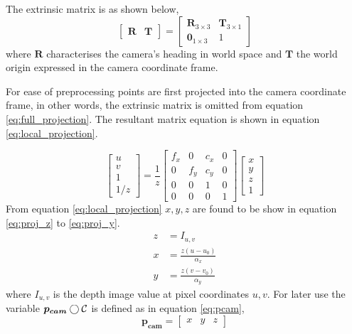 The extrinsic matrix is as shown below,
\begin{equation}\label{eq:extrinsic}
    \begin{bmatrix}
        \boldsymbol{R} & \boldsymbol{T}
    \end{bmatrix}
    =
    \begin{bmatrix}
        \boldsymbol{R}_{3\times3} & \boldsymbol{T}_{3\times1} \\
        \boldsymbol{0}_{1\times3} & 1
    \end{bmatrix}
\end{equation}
where \(\boldsymbol{R}\) characterises the camera's heading in world space and \(\boldsymbol{T}\) the world origin expressed in 
the camera coordinate frame.

For ease of preprocessing points are first projected into the camera coordinate frame, in other words, the extrinsic matrix is omitted from equation \ref{eq:full_projection}.
The resultant matrix equation is shown in equation \ref{eq:local_projection}.

\begin{equation} \label{eq:local_projection}
    \begin{bmatrix}
        u \\
        v \\
        1 \\
        1/z
    \end{bmatrix}
    = \frac{1}{z}
    \begin{bmatrix}
        f_x & 0 & c_x & 0 \\
        0 & f_y & c_y & 0 \\
        0 & 0 & 1 & 0 \\
        0 & 0 & 0 & 1
    \end{bmatrix}
    \begin{bmatrix}
        x\\
        y\\
        z\\
        1
    \end{bmatrix}
\end{equation}
From equation \ref{eq:local_projection} \(x,y,z\) are found to be show in equation \ref{eq:proj_z} to \ref{eq:proj_y}.
\begin{align}
    z &= I_{u,v} \label{eq:proj_z}\\[0.2cm]
    x &= \frac{z(u - u_0)}{\alpha_x}\label{eq:proj_x} \\
    y &= \frac{z(v - v_0)}{\alpha_y}\label{eq:proj_y}
\end{align}
where \(I_{u,v}\) is the depth image value at pixel coordinates \(u,v\). For later use the variable \(\boldsymbol{p_{cam}} \bigcirc\mathcal{C}\) is defined as in equation \ref{eq:pcam},
\begin{equation}\label{eq:pcam}
    \bm{p_{cam}}=
    \begin{bmatrix}
        x &y &z
    \end{bmatrix}
\end{equation}

